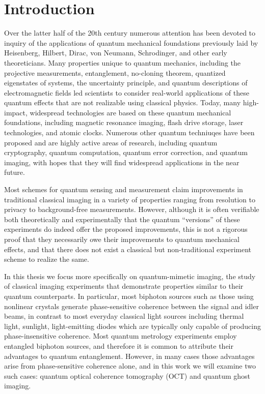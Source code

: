 \chapter{Introduction}
Over the latter half of the 20th century numerous attention has been devoted to inquiry of the applications of quantum mechanical foundations previously laid by Heisenberg, Hilbert, Dirac, von Neumann, Schrodinger, and other early theoreticians. Many properties unique to quantum mechanics, including the projective measurements, entanglement, no-cloning theorem, quantized eigenstates of systems, the uncertainty principle, and quantum descriptions of electromagnetic fields led scientists to consider real-world applications of these quantum effects that are not realizable using classical physics. Today, many high-impact, widespread technologies are based on these quantum mechanical foundations, including magnetic resonance imaging, flash drive storage, laser technologies, and atomic clocks. Numerous other quantum techniuqes have been proposed and are highly active areas of research, including quantum cryptography, quantum computation, quantum error correction, and quantum imaging, with hopes that they will find widespread applications in the near future.

Most schemes for quantum sensing and measurement claim improvements in traditional classical imaging in a variety of properties ranging from resolution to privacy to background-free measurements. However, although it is often verifiable both theoretically and experimentally that the quantum ``versions'' of these experiments do indeed offer the proposed improvements, this is not a rigorous proof that they necessarily owe their improvements to quantum mechanical effects, and that there does not exist a classical but non-traditional experiment scheme to realize the same.

In this thesis we focus more specifically on quantum-mimetic imaging, the study of classical imaging experiments that demonstrate properties similar to their quantum counterparts. In particular, most biphoton sources such as those using nonlinear crystals generate phase-sensitive coherence between the signal and idler beams, in contrast to most everyday classical light sources including thermal light, sunlight, light-emitting diodes which are typically only capable of producing phase-insensitive coherence. Most quantum metrology experiments employ entangled biphoton sources, and therefore it is common to attribute their advantages to quantum entanglement. However, in many cases those advantages arise from phase-sensitive coherence alone, and in this work we will examine two such cases: quantum optical coherence tomography (OCT) and quantum ghost imaging.

